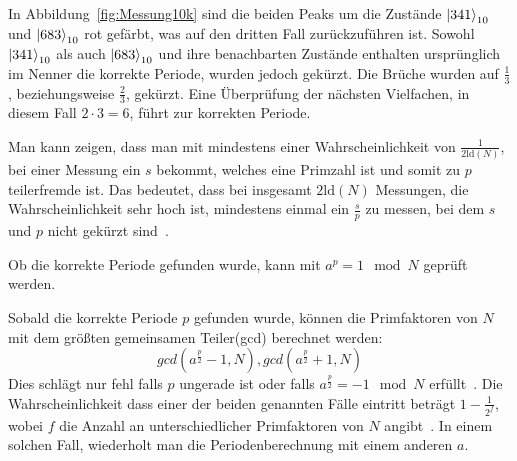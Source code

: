 In Abbildung~\ref{fig:Messung10k} sind die beiden Peaks um die Zustände \(\ket{341}_{10}\) und \(\ket{683}_{10}\) rot gefärbt, 
was auf den dritten Fall zurückzuführen ist.
Sowohl \(\ket{341}_{10}\) als auch \(\ket{683}_{10}\) und ihre benachbarten Zustände 
enthalten ursprünglich im Nenner die korrekte Periode, wurden jedoch gekürzt.
Die Brüche wurden auf \(\frac{1}{3}\), beziehungsweise \(\frac{2}{3}\), gekürzt. 
Eine Überprüfung der nächsten Vielfachen, in diesem Fall \(2 \cdot 3 = 6 \), führt zur korrekten Periode.

Man kann zeigen, dass man mit mindestens einer Wahrscheinlichkeit von \(\frac{1}{2\text{ld}(N)}\), 
bei einer Messung ein \(s\) bekommt, welches eine Primzahl ist und somit zu \(p\) teilerfremde ist.
Das bedeutet, dass bei insgesamt \(2\text{ld}(N)\) Messungen, die Wahrscheinlichkeit sehr hoch ist, mindestens einmal ein \(\frac{s}{p}\)
zu messen, bei dem \(s\) und \(p\) nicht gekürzt sind~\autocite[231]{nielsen_chuang_2010}.

Ob die korrekte Periode gefunden wurde, kann mit \(a^p = 1 \mod N\) geprüft werden.

Sobald die korrekte Periode \(p\) gefunden wurde, 
können die Primfaktoren von \(N\) mit dem größten gemeinsamen Teiler(gcd) berechnet werden:
\[gcd(a^{\frac{p}{2}}-1, N), gcd(a^{\frac{p}{2}}+1, N)\]
Dies schlägt nur fehl falls \(p\) ungerade ist
oder falls \(a^{\frac{p}{2}} = -1 \mod N\) erfüllt~\cite{Shor_1997}.
Die Wahrscheinlichkeit dass einer der beiden genannten Fälle eintritt beträgt \(1-\frac{1}{2^f}\), 
wobei \(f\) die Anzahl an unterschiedlicher Primfaktoren von \(N\) angibt~\cite{Shor_1997}.
In einem solchen Fall, wiederholt man die Periodenberechnung mit einem anderen \(a\).

